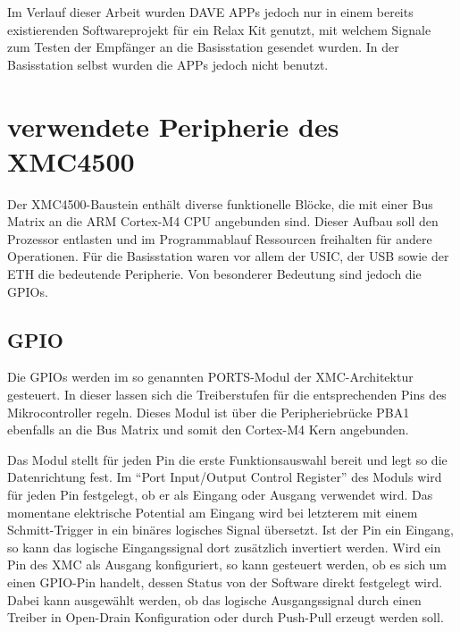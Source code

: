 Im Verlauf dieser Arbeit wurden DAVE  APPs jedoch nur in einem bereits existierenden Softwareprojekt für ein Relax Kit genutzt, mit welchem  Signale zum Testen der Empfänger an die Basisstation gesendet wurden. In der Basisstation selbst wurden die APPs jedoch nicht benutzt.


\section{verwendete Peripherie des XMC4500}


Der XMC4500-Baustein enthält diverse funktionelle Blöcke, die mit einer Bus Matrix an die ARM Cortex-M4 \ac{CPU} angebunden sind. Dieser Aufbau soll den Prozessor entlasten und im Programmablauf Ressourcen freihalten für andere Operationen.%
Für die Basisstation waren vor allem der \acs{USIC}, der \ac{USB} sowie der \ac{ETH} die bedeutende Peripherie. Von besonderer Bedeutung sind jedoch die \acp{GPIO}. %






\subsection{GPIO}
Die \acp{GPIO} werden im so genannten PORTS-Modul der XMC-Architektur gesteuert. In dieser lassen sich die Treiberstufen für die entsprechenden Pins des Mikrocontroller regeln. Dieses Modul ist über die Peripheriebrücke PBA1 ebenfalls an die Bus Matrix  und somit den Cortex-M4 Kern angebunden.  %

Das Modul stellt für jeden Pin die erste Funktionsauswahl bereit und legt so die Datenrichtung fest. Im \enquote{Port Input/Output Control Register} des Moduls wird für jeden Pin festgelegt, ob er als Eingang oder Ausgang verwendet wird. Das momentane elektrische Potential am Eingang wird bei letzterem mit einem Schmitt-Trigger in ein binäres logisches Signal übersetzt. Ist der Pin ein Eingang, so kann das logische Eingangssignal dort zusätzlich invertiert werden. Wird ein Pin des XMC als Ausgang konfiguriert, so kann gesteuert werden, ob es sich um einen \ac{GPIO}-Pin handelt, dessen Status von der Software direkt festgelegt wird. Dabei kann ausgewählt werden, ob das logische Ausgangssignal durch einen Treiber in Open-Drain Konfiguration oder durch Push-Pull erzeugt werden soll. 

